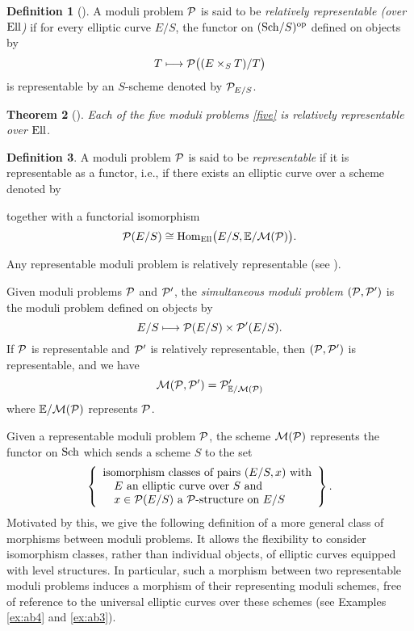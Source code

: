 \documentclass{gtpart}
\newtheorem{thm}{Theorem}
\theoremstyle{definition}
\newtheorem{defn}[thm]{Definition}
\theoremstyle{remark}
\newcommand{\mb}[1]{\mathbb{#1}}
\newcommand{\Hom}{\ensuremath{{\rm Hom}}}
\newcommand{\Ell}{{\rm Ell}}
\newcommand{\Sch}{{\rm Sch}}
\newcommand{\CM}{{\cal M}}
\newcommand{\CP}{{\cal P}}
\newcommand{\BE}{{\mb E}}
\newcommand{\op}{{\rm op}}
\numberwithin{equation}{section}
\numberwithin{thm}{section}
\begin{document}
\begin{defn}[{\cite[4.2]{KM}}]
 A moduli problem $\CP$ is said to be {\em relatively representable 
 (over $\Ell$)} if for every elliptic curve $E/S$, the functor on 
 $(\Sch/S)^\op$ defined on objects by 
 \[
  T \longmapsto \CP \big( (E \times_S T) / T \big) 
 \]
 is representable by an $S$-scheme denoted by $\CP_{E/S}$.  
\end{defn}

\begin{thm}[{\cite[5.1.1, 7.9.6, and 7.1.3(1)]{KM}}]
\label{thm:relrep}
 Each of the five moduli problems \eqref{five} is relatively 
 representable over $\Ell$.  
\end{thm}

\begin{defn}
 A moduli problem $\CP$ is said to be {\em representable} if it is 
 representable as a functor, i.e., if there exists an elliptic curve 
 over a scheme denoted by 
 \begin{center}
 \end{center}
 together with a functorial isomorphism 
 \[
  \CP(E/S) \cong \Hom_\Ell \big( E/S, \BE/\CM(\CP) \big).  
 \]
\end{defn}

Any representable moduli problem is relatively representable (see 
\cite[4.3.2]{KM}).  

Given moduli problems $\CP$ and $\CP'$, the {\em simultaneous moduli 
problem $(\CP,\CP')$} is the moduli problem defined on objects by 
\[
 E/S \longmapsto \CP(E/S) \times \CP'(E/S).  
\]
If $\CP$ is representable and $\CP'$ is relatively representable, then 
$(\CP,\CP')$ is representable, and we have 
\[
 \CM(\CP,\CP') = \CP'_{\BE/\CM(\CP)} 
\]
where $\BE/\CM(\CP)$ represents $\CP$.  

Given a representable moduli problem $\CP$, the scheme $\CM(\CP)$ 
represents the functor on $\Sch$ which sends a scheme $S$ to the set 
\[
 \left\{
  \begin{array}{l}
   \text{isomorphism classes of pairs $(E/S,x)$ with} \\
   \quad \text{$E$ an elliptic curve over $S$ and} \\
   \quad \text{$x \in \CP(E/S)$ a $\CP$-structure on $E/S$} 
  \end{array}
 \right\}.  
\]
Motivated by this, we give the following definition of a more general 
class of morphisms between moduli problems.  It allows the flexibility 
to consider isomorphism classes, rather than individual objects, of 
elliptic curves equipped with level structures.  In particular, such a 
morphism between two representable moduli problems induces a morphism of 
their representing moduli schemes, free of reference to the universal 
elliptic curves over these schemes (see Examples \ref{ex:ab4} and 
\ref{ex:ab3}).  
\end{document}
